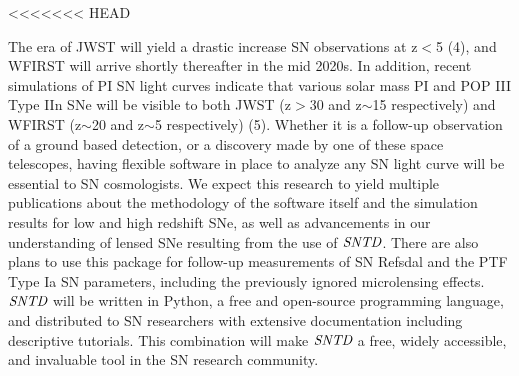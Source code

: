 <<<<<<< HEAD

 The era of JWST will yield a drastic increase SN observations at
z$<$5 (4), and WFIRST will arrive shortly thereafter in the mid
2020s. In addition, recent simulations of PI SN light curves indicate
that various solar mass PI and POP III Type IIn SNe will be visible to
both JWST (z$>$30 and z$\sim$15 respectively) and WFIRST (z$\sim$20
and z$\sim$5 respectively) (5). Whether it is a follow-up observation
of a ground based detection, or a discovery made by one of these space
telescopes, having flexible software in place to analyze any SN light
curve will be essential to SN cosmologists. We expect this research to
yield multiple publications about the methodology of the software
itself and the simulation results for low and high redshift SNe, as
well as advancements in our understanding of lensed SNe resulting from
the use of $\textit{SNTD}$. There are also plans to use this package
for follow-up measurements of SN Refsdal and the PTF Type Ia SN
parameters, including the previously ignored microlensing
effects. $\textit{SNTD}$ will be written in Python, a free and
open-source programming language, and distributed to SN researchers
with extensive documentation including descriptive tutorials. This
combination will make $\textit{SNTD}$ a free, widely accessible, and
invaluable tool in the SN research community.  
